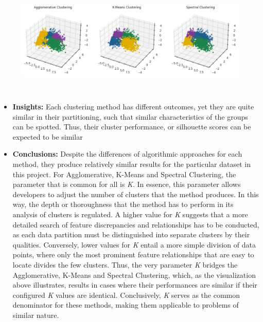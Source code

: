 \documentclass[11pt]{article}
\begin{document}
\vspace{1\baselineskip}
\begin{figure}[H]
\centering
\includegraphics[width=15.92cm,height=5.33cm]{./images/image13.png}
\end{figure}


\vspace{1\baselineskip}
\begin{itemize}
	\item \textbf{Insights:} Each clustering method has different outcomes, yet they are quite similar in their partitioning, such that similar characteristics of the groups can be spotted. Thus, their cluster performance, or silhouette scores can be expected to be similar

\end{itemize}
\vspace{1\baselineskip}
\begin{itemize}
	\item \textbf{Conclusions:} Despite the differences of algorithmic approaches for each method, they produce relatively similar results for the particular dataset in this project. For Agglomerative, K-Means and Spectral Clustering, the parameter that is common for all is \textit{K}. In essence, this parameter allows developers to adjust the number of clusters that the method produces. In this way, the depth or thoroughness that the method has to perform in its analysis of clusters is regulated. A higher value for \textit{K} suggests that a more detailed search of feature discrepancies and relationships has to be conducted, as each data partition must be distinguished into separate clusters by their qualities. Conversely, lower values for \textit{K} entail a more simple division of data points, where only the most prominent feature relationships that are easy to locate divides the few clusters. Thus, the very parameter \textit{K} bridges the Agglomerative, K-Means and Spectral Clustering, which, as the visualization above illustrates, results in cases where their performances are similar if their configured \textit{K} values are identical. Conclusively, \textit{K} serves as the common denominator for these methods, making them applicable to problems of similar nature.

\end{itemize}
\end{document}
